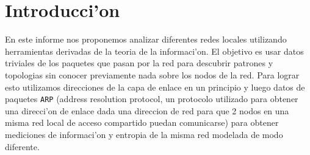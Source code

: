 \section{Introducci'on}
En este informe nos proponemos analizar diferentes redes locales utilizando herramientas derivadas de la
teoria de la informaci'on. El objetivo es usar datos triviales de los paquetes que pasan
por la red para descubrir patrones y topologias sin conocer previamente nada sobre los nodos de la red. Para lograr esto
utilizamos direcciones de la capa de enlace en un principio y luego datos de paquetes \texttt{ARP} (address resolution protocol,
un protocolo  utilizado para obtener una direcci'on de enlace dada una direccion de red para que 2 nodos en 
una misma red local de acceso compartido puedan comunicarse) para obtener mediciones de informaci'on y entropia de la misma
red modelada de modo diferente.
